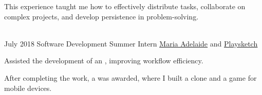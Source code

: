 \begin{rightcolumn}
{            This experience taught me how to effectively distribute tasks, collaborate on complex projects, and develop persistence in problem-solving.
        }

\vfill\medbreak

 \\

    \cvevent
    {July 2018}
    {Software Development Summer Intern}
    {\href{https://mariaadelaide.com/}{\underline{Maria Adelaide}} and \href{http://playsketch.net}{\underline{Playsketch}}}
    {
        Assisted the development of an , improving workflow efficiency.
        
        After completing the work, a  was awarded, where I built a  clone and a  game for mobile devices.
    }

\vfill\medbreak
\end{rightcolumn}
